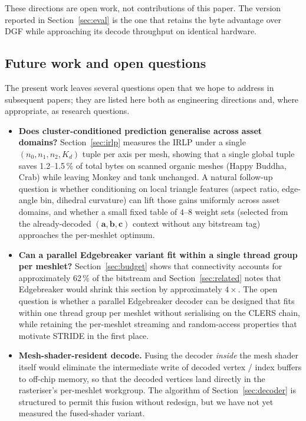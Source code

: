 \documentclass[pdflatex,sn-vancouver-num]{sn-jnl}%
\theoremstyle{thmstyleone}%
\theoremstyle{thmstyletwo}%
\theoremstyle{thmstylethree}%
\begin{document}
These directions are open work, not contributions of this paper. The version reported in Section~\ref{sec:eval} is the one that retains the byte advantage over DGF while approaching its decode throughput on identical hardware.

\subsection{Future work and open questions}

The present work leaves several questions open that we hope to address in subsequent papers; they are listed here both as engineering directions and, where appropriate, as research questions.

\begin{itemize}
\item \textbf{Does cluster-conditioned prediction generalise across asset domains?} Section~\ref{sec:irlp} measures the IRLP under a single $(n_0, n_1, n_2, K_d)$ tuple per axis per mesh, showing that a single global tuple saves 1.2--1.5\,\% of total bytes on scanned organic meshes (Happy Buddha, Crab) while leaving Monkey and tank unchanged. A natural follow-up question is whether conditioning on local triangle features (aspect ratio, edge-angle bin, dihedral curvature) can lift those gains uniformly across asset domains, and whether a small fixed table of $4$--$8$ weight sets (selected from the already-decoded $(\mathbf{a}, \mathbf{b}, \mathbf{c})$ context without any bitstream tag) approaches the per-meshlet optimum.
\item \textbf{Can a parallel Edgebreaker variant fit within a single thread group per meshlet?} Section~\ref{sec:budget} shows that connectivity accounts for approximately 62\,\% of the bitstream and Section~\ref{sec:related} notes that Edgebreaker would shrink this section by approximately $4\times$. The open question is whether a parallel Edgebreaker decoder can be designed that fits within one thread group per meshlet without serialising on the CLERS chain, while retaining the per-meshlet streaming and random-access properties that motivate STRIDE in the first place.
\item \textbf{Mesh-shader-resident decode.} Fusing the decoder \emph{inside} the mesh shader itself would eliminate the intermediate write of decoded vertex / index buffers to off-chip memory, so that the decoded vertices land directly in the rasteriser's per-meshlet workgroup. The algorithm of Section~\ref{sec:decoder} is structured to permit this fusion without redesign, but we have not yet measured the fused-shader variant.

\end{itemize}
\end{document}
